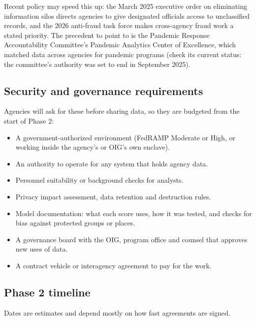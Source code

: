 \documentclass[letterpaper,11pt]{article}
\providecommand{\tightlist}{\setlength{\itemsep}{0pt}\setlength{\parskip}{0pt}}
\begin{document}
Recent policy may speed this up: the March 2025 executive order on
eliminating information silos directs agencies to give designated
officials access to unclassified records, and the 2026 anti-fraud task
force makes cross-agency fraud work a stated priority. The precedent to
point to is the Pandemic Response Accountability Committee's Pandemic
Analytics Center of Excellence, which matched data across agencies for
pandemic programs (check its current status: the committee's authority
was set to end in September 2025).

\hypertarget{security-and-governance-requirements}{%
\subsection{Security and governance
requirements}\label{security-and-governance-requirements}}

Agencies will ask for these before sharing data, so they are budgeted
from the start of Phase 2:

\begin{itemize}
\tightlist
\item
  A government-authorized environment (FedRAMP Moderate or High, or
  working inside the agency's or OIG's own enclave).
\item
  An authority to operate for any system that holds agency data.
\item
  Personnel suitability or background checks for analysts.
\item
  Privacy impact assessment, data retention and destruction rules.
\item
  Model documentation: what each score uses, how it was tested, and
  checks for bias against protected groups or places.
\item
  A governance board with the OIG, program office and counsel that
  approves new uses of data.
\item
  A contract vehicle or interagency agreement to pay for the work.
\end{itemize}

\hypertarget{phase-2-timeline}{%
\subsection{Phase 2 timeline}\label{phase-2-timeline}}

Dates are estimates and depend mostly on how fast agreements are signed.
\end{document}
